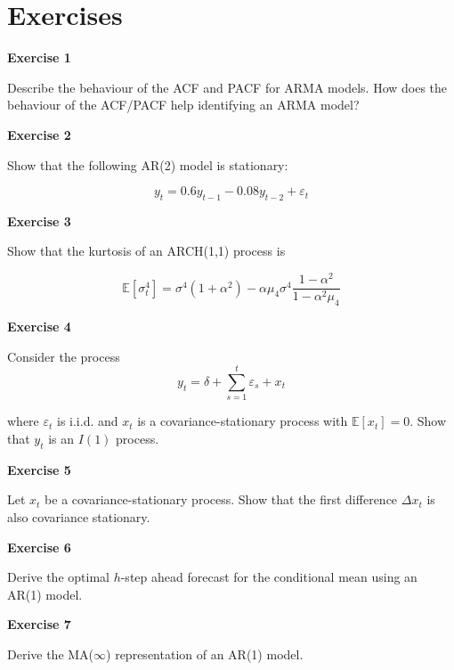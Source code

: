 \documentclass[
]{book}
\begin{document}
\hypertarget{exercises-5}{%
\section{Exercises}\label{exercises-5}}

\textbf{Exercise 1}

Describe the behaviour of the ACF and PACF for ARMA models. How does the behaviour of the ACF/PACF help identifying an ARMA model?

\textbf{Exercise 2}

Show that the following AR(2) model is stationary:

\[
y_t = 0.6 y_{t-1} - 0.08 y_{t-2} + \varepsilon_t
\]

\textbf{Exercise 3}

Show that the kurtosis of an ARCH(1,1) process is

\[
\mathbb{E}[\sigma_t^4] = \sigma^4(1+\alpha^2) - \alpha \mu_4 \sigma^4 \frac{1-\alpha^2}{1-\alpha^2 \mu_4}
\]

\textbf{Exercise 4}

Consider the process
\[
y_t = \delta + \sum_{s=1}^t \varepsilon_s + x_t
\]

where \(\varepsilon_t\) is i.i.d. and \(x_t\) is a covariance-stationary process with \(\mathbb{E}[x_t] = 0\). Show that \(y_t\) is an \(I(1)\) process.

\textbf{Exercise 5}

Let \(x_t\) be a covariance-stationary process. Show that the first difference \(\Delta x_t\) is also covariance stationary.

\textbf{Exercise 6}

Derive the optimal \(h\)-step ahead forecast for the conditional mean using an AR(1) model.

\textbf{Exercise 7}

Derive the MA(\(\infty\)) representation of an AR(1) model.

  
\end{document}
